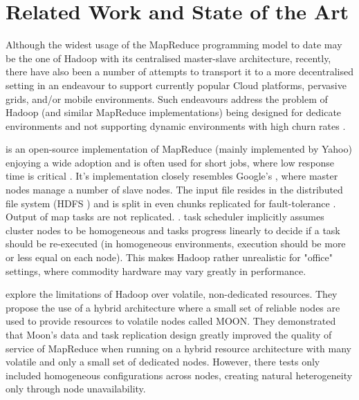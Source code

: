 \chapter{Related Work and State of the Art}
Although the widest usage of the MapReduce programming model to date may be the one of Hadoop \cite{Hadoop} with its centralised master-slave architecture, recently, there have also been a number of attempts to transport it to a more decentralised setting in an endeavour to support currently popular Cloud platforms, pervasive grids, and/or mobile environments. Such endeavours address the problem of Hadoop (and similar MapReduce implementations) being designed for dedicate environments and not supporting dynamic environments with high churn rates \cite{CReSTIC-2677}.

\cite{Hadoop} is an open-source implementation of MapReduce (mainly implemented by Yahoo) enjoying a wide adoption and is often used for short jobs, where low response time is critical \cite{Zaharia:2008:IMP:1855741.1855744}. It's implementation closely resembles Google's \cite{Dean2008}, where master nodes manage a number of slave nodes. The input file resides in the distributed file system (HDFS \cite{Lin:2010:MMO:1851476.1851489}) and is split in even chunks replicated for fault-tolerance \cite{Zaharia:2008:IMP:1855741.1855744}. Output of map tasks are not replicated. \cite{Lin:2010:MMO:1851476.1851489}. task scheduler implicitly assumes cluster nodes to be homogeneous and tasks progress linearly to decide if a task should be re-executed (in homogeneous environments, execution should be more or less equal on each node). This makes Hadoop rather unrealistic for "office" settings, where commodity hardware may vary greatly in performance. 

\cite{Lin:2010:MMO:1851476.1851489} explore the limitations of Hadoop over volatile, non-dedicated resources. They propose the use of a hybrid architecture where a small set of reliable nodes are used to provide resources to volatile nodes called MOON. They demonstrated that Moon's data and task replication design greatly improved the quality of service of MapReduce when running on a hybrid resource architecture with many volatile and only a small set of dedicated nodes. However, there tests only included homogeneous configurations across nodes, creating natural heterogeneity only through node unavailability.

